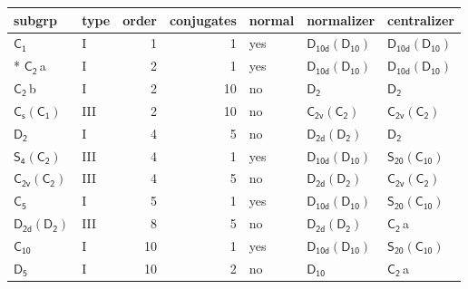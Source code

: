 \documentclass[10pt,a4paper]{article}
\numberwithin{equation}{section}
\newcommand{\grp}[1]{\mathsf{#1}}
\newcommand{\clsletter}[1]{\,{\scriptsize\color{black!55}#1}}
\begin{document}
{\small\begin{longtable}{@{}llrrlll@{}}\toprule
subgrp & type & order & conjugates & normal & normalizer & centralizer\\\midrule\endhead
\bottomrule\endfoot\endlastfoot
\href{../../../rotation/data/pdf/C1.pdf}{$\grp{C_{1}}$} & I & 1 & 1 & yes & \href{D10d-D10.pdf}{$\grp{D_{10d}}(\grp{D_{10}})$} & \href{D10d-D10.pdf}{$\grp{D_{10d}}(\grp{D_{10}})$}\\*
\href{../../../rotation/data/pdf/C2.pdf}{$\grp{C_{2}}$}\clsletter{a} & I & 2 & 1 & yes & \href{D10d-D10.pdf}{$\grp{D_{10d}}(\grp{D_{10}})$} & \href{D10d-D10.pdf}{$\grp{D_{10d}}(\grp{D_{10}})$}\\
\href{../../../rotation/data/pdf/C2.pdf}{$\grp{C_{2}}$}\clsletter{b} & I & 2 & 10 & no & \href{../../../rotation/data/pdf/D2.pdf}{$\grp{D_{2}}$} & \href{../../../rotation/data/pdf/D2.pdf}{$\grp{D_{2}}$}\\
\href{C1v-C1.pdf}{$\grp{C_{s}}(\grp{C_{1}})$} & III & 2 & 10 & no & \href{C2v-C2.pdf}{$\grp{C_{2v}}(\grp{C_{2}})$} & \href{C2v-C2.pdf}{$\grp{C_{2v}}(\grp{C_{2}})$}\\
\href{../../../rotation/data/pdf/D2.pdf}{$\grp{D_{2}}$} & I & 4 & 5 & no & \href{D2d-D2.pdf}{$\grp{D_{2d}}(\grp{D_{2}})$} & \href{../../../rotation/data/pdf/D2.pdf}{$\grp{D_{2}}$}\\
\href{S4-C2.pdf}{$\grp{S_{4}}(\grp{C_{2}})$} & III & 4 & 1 & yes & \href{D10d-D10.pdf}{$\grp{D_{10d}}(\grp{D_{10}})$} & \href{S20-C10.pdf}{$\grp{S_{20}}(\grp{C_{10}})$}\\
\href{C2v-C2.pdf}{$\grp{C_{2v}}(\grp{C_{2}})$} & III & 4 & 5 & no & \href{D2d-D2.pdf}{$\grp{D_{2d}}(\grp{D_{2}})$} & \href{C2v-C2.pdf}{$\grp{C_{2v}}(\grp{C_{2}})$}\\
\href{../../../rotation/data/pdf/C5.pdf}{$\grp{C_{5}}$} & I & 5 & 1 & yes & \href{D10d-D10.pdf}{$\grp{D_{10d}}(\grp{D_{10}})$} & \href{S20-C10.pdf}{$\grp{S_{20}}(\grp{C_{10}})$}\\
\href{D2d-D2.pdf}{$\grp{D_{2d}}(\grp{D_{2}})$} & III & 8 & 5 & no & \href{D2d-D2.pdf}{$\grp{D_{2d}}(\grp{D_{2}})$} & \href{../../../rotation/data/pdf/C2.pdf}{$\grp{C_{2}}$}\clsletter{a}\\
\href{../../../rotation/data/pdf/C10.pdf}{$\grp{C_{10}}$} & I & 10 & 1 & yes & \href{D10d-D10.pdf}{$\grp{D_{10d}}(\grp{D_{10}})$} & \href{S20-C10.pdf}{$\grp{S_{20}}(\grp{C_{10}})$}\\
\href{../../../rotation/data/pdf/D5.pdf}{$\grp{D_{5}}$} & I & 10 & 2 & no & \href{../../../rotation/data/pdf/D10.pdf}{$\grp{D_{10}}$} & \href{../../../rotation/data/pdf/C2.pdf}{$\grp{C_{2}}$}\clsletter{a}\\

\end{longtable}}
\end{document}
